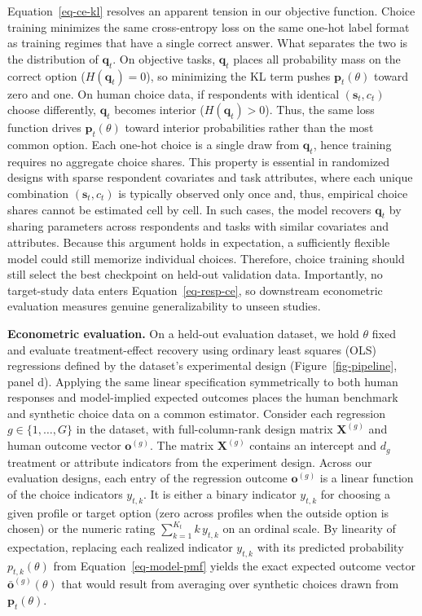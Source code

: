 \documentclass[
  11pt,
  letterpaper,
]{article}
\begin{document}
Equation~\ref{eq-ce-kl} resolves an apparent tension in our objective
function. Choice training minimizes the same cross-entropy loss on the
same one-hot label format as training regimes that have a single correct
answer. What separates the two is the distribution of \(\mathbf{q}_t\).
On objective tasks, \(\mathbf{q}_t\) places all probability mass on the
correct option (\(H(\mathbf{q}_t) = 0\)), so minimizing the KL term
pushes \(\mathbf{p}_t(\theta)\) toward zero and one. On human choice
data, if respondents with identical \((\mathbf{s}_t, c_t)\) choose
differently, \(\mathbf{q}_t\) becomes interior
(\(H(\mathbf{q}_t) > 0\)). Thus, the same loss function drives
\(\mathbf{p}_t(\theta)\) toward interior probabilities rather than the
most common option. Each one-hot choice is a single draw from
\(\mathbf{q}_t\), hence training requires no aggregate choice shares.
This property is essential in randomized designs with sparse respondent
covariates and task attributes, where each unique combination
\((\mathbf{s}_t, c_t)\) is typically observed only once and, thus,
empirical choice shares cannot be estimated cell by cell. In such cases,
the model recovers \(\mathbf{q}_t\) by sharing parameters across
respondents and tasks with similar covariates and attributes. Because
this argument holds in expectation, a sufficiently flexible model could
still memorize individual choices. Therefore, choice training should
still select the best checkpoint on held-out validation data.
Importantly, no target-study data enters Equation~\ref{eq-resp-ce}, so
downstream econometric evaluation measures genuine generalizability to
unseen studies.

\textbf{Econometric evaluation.} On a held-out evaluation dataset, we
hold \(\theta\) fixed and evaluate treatment-effect recovery using
ordinary least squares (OLS) regressions defined by the dataset's
experimental design (Figure~\ref{fig-pipeline}, panel d). Applying the
same linear specification symmetrically to both human responses and
model-implied expected outcomes places the human benchmark and synthetic
choice data on a common estimator. Consider each regression
\(g \in \{1, \dots, G\}\) in the dataset, with full-column-rank design
matrix \(\mathbf{X}^{(g)}\) and human outcome vector
\(\mathbf{o}^{(g)}\). The matrix \(\mathbf{X}^{(g)}\) contains an
intercept and \(d_g\) treatment or attribute indicators from the
experiment design. Across our evaluation designs, each entry of the
regression outcome \(\mathbf{o}^{(g)}\) is a linear function of the
choice indicators \(y_{t,k}\). It is either a binary indicator
\(y_{t,k}\) for choosing a given profile or target option (zero across
profiles when the outside option is chosen) or the numeric rating
\(\sum_{k=1}^{K_t} k\,y_{t,k}\) on an ordinal scale. By linearity of
expectation, replacing each realized indicator \(y_{t,k}\) with its
predicted probability \(p_{t,k}(\theta)\) from
Equation~\ref{eq-model-pmf} yields the exact expected outcome vector
\(\bar{\mathbf{o}}^{(g)}(\theta)\) that would result from averaging over
synthetic choices drawn from \(\mathbf{p}_t(\theta)\).
\end{document}
